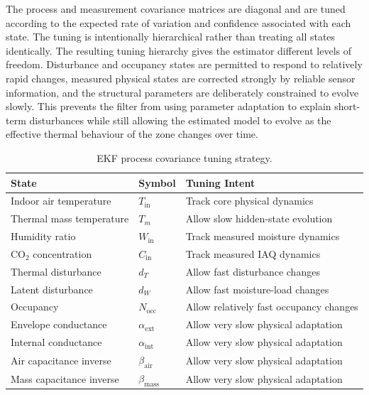 \documentclass[12pt, a4paper]{article}
\begin{document}
	The process and measurement covariance matrices are diagonal and are tuned according to the expected rate of variation and confidence associated with each state. The tuning is intentionally hierarchical rather than treating all states identically.
	The resulting tuning hierarchy gives the estimator different levels of freedom. Disturbance and occupancy states are permitted to respond to relatively rapid changes, measured physical states are corrected strongly by reliable sensor information, and the structural parameters are deliberately constrained to evolve slowly. This prevents the filter from using parameter adaptation to explain short-term disturbances while still allowing the estimated model to evolve as the effective thermal behaviour of the zone changes over time.

	
	\begin{table}[ht]
		\centering
		\caption{EKF process covariance tuning strategy.}
		\label{tab:EKF_state_covariances}
		\begin{tabular}{lll}
			\toprule
			\textbf{State} & \textbf{Symbol} & \textbf{Tuning Intent} \\
			\midrule
			Indoor air temperature
			& $T_{\mathrm{in}}$
			& Track core physical dynamics \\
			
			Thermal mass temperature
			& $T_m$
			& Allow slow hidden-state evolution \\
			
			Humidity ratio
			& $W_{\mathrm{in}}$
			& Track measured moisture dynamics \\
			
			CO$_2$ concentration
			& $C_{\mathrm{in}}$
			& Track measured IAQ dynamics \\
			
			Thermal disturbance
			& $d_T$
			& Allow fast disturbance changes \\
			
			Latent disturbance
			& $d_W$
			& Allow fast moisture-load changes \\
			
			Occupancy
			& $N_{\mathrm{occ}}$
			& Allow relatively fast occupancy changes \\
			
			Envelope conductance
			& $\alpha_{\mathrm{ext}}$
			& Allow very slow physical adaptation \\
			
			Internal conductance
			& $\alpha_{\mathrm{int}}$
			& Allow very slow physical adaptation \\
			
			Air capacitance inverse
			& $\beta_{\mathrm{air}}$
			& Allow very slow physical adaptation \\
			
			Mass capacitance inverse
			& $\beta_{\mathrm{mass}}$
			& Allow very slow physical adaptation \\
			
			\bottomrule
		\end{tabular}
	\end{table}
	
\end{document}
